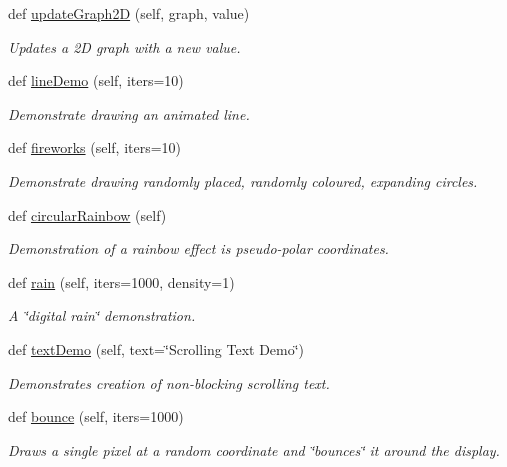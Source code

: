 \begin{DoxyCompactItemize}
def \hyperlink{classglowbit_1_1glowbitMatrix_ae9083babec0d5004363782540b60baed}{update\+Graph2D} (self, graph, value)
\begin{DoxyCompactList}\small\item\em Updates a 2D graph with a new value. \end{DoxyCompactList}\item 
\mbox{\label{classglowbit_1_1glowbitMatrix_a0071fd8471e5f519586f6fdd86f8d7f3}} 
def \hyperlink{classglowbit_1_1glowbitMatrix_a0071fd8471e5f519586f6fdd86f8d7f3}{line\+Demo} (self, iters=10)
\begin{DoxyCompactList}\small\item\em Demonstrate drawing an animated line. \end{DoxyCompactList}\item 
def \hyperlink{classglowbit_1_1glowbitMatrix_a69370ec1479b4887fca517fbefd92e4c}{fireworks} (self, iters=10)
\begin{DoxyCompactList}\small\item\em Demonstrate drawing randomly placed, randomly coloured, expanding circles. \end{DoxyCompactList}\item 
def \hyperlink{classglowbit_1_1glowbitMatrix_adf29bdb4294bcf27ae560130b0fcae35}{circular\+Rainbow} (self)
\begin{DoxyCompactList}\small\item\em Demonstration of a rainbow effect is pseudo-\/polar coordinates. \end{DoxyCompactList}\item 
def \hyperlink{classglowbit_1_1glowbitMatrix_a690a172f923caeb55e3adf012ec0600c}{rain} (self, iters=1000, density=1)
\begin{DoxyCompactList}\small\item\em A \char`\"{}digital rain\char`\"{} demonstration. \end{DoxyCompactList}\item 
def \hyperlink{classglowbit_1_1glowbitMatrix_a6232220b12c86c7ec361cde374419ac4}{text\+Demo} (self, text=\char`\"{}Scrolling Text Demo\char`\"{})
\begin{DoxyCompactList}\small\item\em Demonstrates creation of non-\/blocking scrolling text. \end{DoxyCompactList}\item 
\mbox{\label{classglowbit_1_1glowbitMatrix_a969352871a02db3d55bcabe5b5107574}} 
def \hyperlink{classglowbit_1_1glowbitMatrix_a969352871a02db3d55bcabe5b5107574}{bounce} (self, iters=1000)
\begin{DoxyCompactList}\small\item\em Draws a single pixel at a random coordinate and \char`\"{}bounces\char`\"{} it around the display. \end{DoxyCompactList}\end{DoxyCompactItemize}

